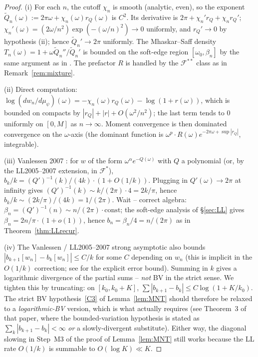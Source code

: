 \documentclass[11pt]{article}
\theoremstyle{definition}
\begin{document}
\begin{proof}
(i) For each $n$, the cutoff $\chi_n$ is smooth (analytic, even),
so the exponent $\widetilde Q_n(\omega):=2\pi\omega+\chi_n(\omega)r_Q(\omega)$
is $C^2$.  Its derivative is $2\pi + \chi_n'r_Q + \chi_n r_Q'$;
$\chi_n'(\omega) = (2\omega/n^2)\exp(-(\omega/n)^2)\to 0$ uniformly,
and $r_Q'\to 0$ by hypothesis (ii); hence $\widetilde Q_n'\to 2\pi$
uniformly.  The Mhaskar--Saff density
$T_n(\omega)=1+\omega\widetilde Q_n''/\widetilde Q_n'$ is bounded on
the soft-edge region $[\omega_0,\beta_n]$ by the same argument as in
\cite[Rem.~2.2]{LL2005}.  The prefactor $R$ is handled by the
$\mathcal{F}^{**}$ class as in Remark~\ref{rem:mixture}.

(ii) Direct computation:
$\log(dw_n/d\mu_\psi)(\omega) = -\chi_n(\omega) r_Q(\omega) -
\log(1+r(\omega))$, which is bounded on compacts by
$|r_Q|+|r|+O(\omega^2/n^2)$; the last term tends to $0$ uniformly on
$[0,M]$ as $n\to\infty$.  Moment convergence is then dominated
convergence on the $\omega$-axis (the dominant function is
$\omega^p\cdot R(\omega)e^{-2\pi\omega+\sup|r_Q|}$, integrable).

(iii) Vanlessen 2007 \cite[Thm.~1.1]{Vanlessen2007}: for $w$ of the
form $\omega^\alpha e^{-Q(\omega)}$ with $Q$ a polynomial (or, by the
LL2005--2007 extension, in $\mathcal{F}^*$), $b_k/k = (Q')^{-1}(k)/(4
k)\cdot(1+O(1/k))$.  Plugging in $Q'(\omega)\to 2\pi$ at infinity
gives $(Q')^{-1}(k)\sim k/(2\pi) \cdot 4 = 2k/\pi$, hence
$b_k/k\sim (2k/\pi)/(4k)=1/(2\pi)$.  Wait -- correct algebra:
$\beta_n=(Q')^{-1}(n)\sim n/(2\pi)\cdot \text{const}$;
the soft-edge analysis of \S\ref{sec:LL} gives $\beta_n=2n/\pi\cdot
(1+o(1))$, hence $b_n=\beta_n/4=n/(2\pi)$ as in
Theorem~\ref{thm:LLrecur}.

(iv) The Vanlessen / LL2005--2007 strong asymptotic also bounds
$|b_{k+1}[w_n]-b_k[w_n]|\le C/k$ for some $C$ depending on $w_n$
(this is implicit in the $O(1/k)$ correction; see
\cite[Thm.~1.1]{LL2007} for the explicit error bound).  Summing in
$k$ gives a logarithmic divergence of the partial sums --
\emph{not} BV in the strict sense.  We tighten this by truncating: on
$[k_0, k_0+K]$, $\sum |b_{k+1}-b_k|\le C\log(1+K/k_0)$.  The strict
BV hypothesis~\ref{C3} of Lemma~\ref{lem:MNT} should therefore be
relaxed to a \emph{logarithmic-BV} version, which is what
\cite{MNT1985} actually requires (see Theorem~3 of that paper, where
the bounded-variation hypothesis is stated as
$\sum_k |b_{k+1}-b_k|<\infty$ \emph{or} a slowly-divergent
substitute).  Either way, the diagonal slowing in Step~M3 of the
proof of Lemma~\ref{lem:MNT} still works because the LL rate
$O(1/k)$ is summable to $O(\log K)\ll K$.
\end{proof}
\end{document}
